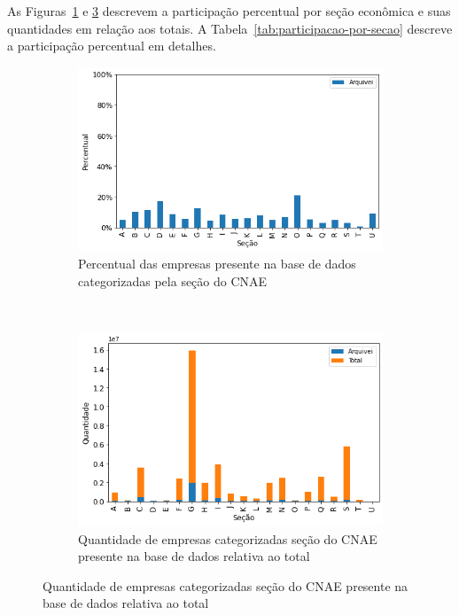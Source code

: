 As Figuras~\ref{fig:base-de-dados:descritiva-7.1-presenca-por-secao} e \ref{fig:base-de-dados:descritiva-7.2-qtde-por-secao} descrevem a participação percentual por seção econômica e suas quantidades em relação aos totais. A Tabela~\ref{tab:participacao-por-secao} descreve a participação percentual em detalhes.

\begin{figure}[htb]
    \centering
    \caption{Participação por seção do CNAE das empresas presentes na base de dados}
    \label{fig:base-de-dados:descritiva-7-presenca-por-secao}
    \begin{subfigure}[b]{1.0\textwidth} 
        \centering
        \includegraphics[scale=0.7]{images/base-de-dados-7.1-presenca-por-secao.png}
        \caption{Percentual das empresas presente na base de dados categorizadas pela seção do CNAE}
        \label{fig:base-de-dados:descritiva-7.1-presenca-por-secao}
    \end{subfigure} ~ \\
    \begin{subfigure}[b]{1.0\textwidth}
        \centering
        \includegraphics[scale=0.7]{images/base-de-dados-7.2-qtde-por-secao.png}
        \caption{Quantidade de empresas categorizadas seção do CNAE presente na base de dados relativa ao total}
        \label{fig:base-de-dados:descritiva-7.2-qtde-por-secao}
    \end{subfigure}
    \fdadospesquisa
\end{figure}

